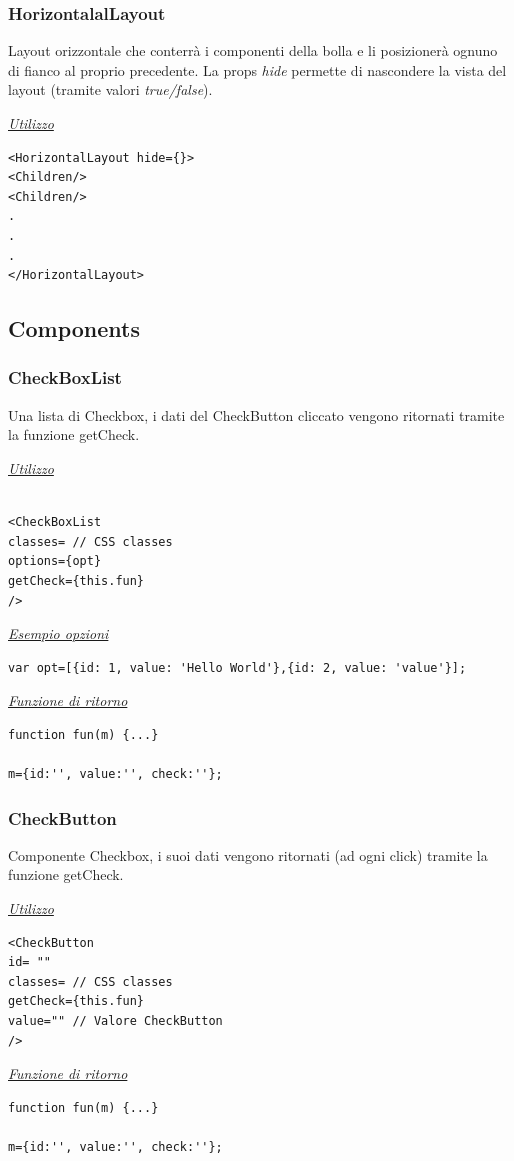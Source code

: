 \subsubsection{HorizontalalLayout}
Layout orizzontale che conterrà i componenti della bolla e li posizionerà ognuno di fianco al proprio precedente. La props \textit{hide} permette di nascondere la vista del layout (tramite valori \textit{true/false}).
\begin{center}
\underline{\textit{Utilizzo}}
\begin{lstlisting}
<HorizontalLayout hide={}>
<Children/>
<Children/>
.
.
.
</HorizontalLayout>
\end{lstlisting}
\end{center}

\subsection{Components}
\subsubsection{CheckBoxList}
Una lista di Checkbox, i dati del CheckButton cliccato vengono ritornati tramite la funzione getCheck.
\begin{center}
\underline{\textit{Utilizzo}}
\begin{lstlisting} 

<CheckBoxList 
classes= // CSS classes 
options={opt} 
getCheck={this.fun}
/>
\end{lstlisting}
\underline{\textit{Esempio opzioni}}
\begin{lstlisting}
var opt=[{id: 1, value: 'Hello World'},{id: 2, value: 'value'}];
\end{lstlisting}
\underline{\textit{Funzione di ritorno}}
\begin{lstlisting}
function fun(m) {...}

m={id:'', value:'', check:''};
\end{lstlisting}
\end{center}

\subsubsection{CheckButton}

Componente Checkbox, i suoi dati vengono ritornati (ad ogni click) tramite la funzione getCheck.
\begin{center}	
\underline{\textit{Utilizzo}}
\begin{lstlisting}
<CheckButton
id= ""
classes= // CSS classes
getCheck={this.fun} 
value="" // Valore CheckButton
/>
\end{lstlisting}
\underline{\textit{Funzione di ritorno}}
\begin{lstlisting}
function fun(m) {...}

m={id:'', value:'', check:''};
\end{lstlisting}
\end{center}


